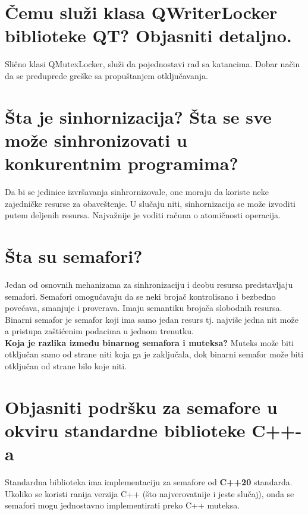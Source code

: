 \documentclass[a4paper]{article}
\begin{document}
\section{Čemu služi klasa QWriterLocker biblioteke QT? Objasniti detaljno.}

  Slično klasi QMutexLocker, služi da pojednostavi rad sa katancima. 
  Dobar način da se preduprede greške sa propuštanjem otključavanja.
  
\section{Šta je sinhornizacija?	Šta se sve može sinhronizovati u konkurentnim programima?}
  Da bi se jedinice izvršavanja sinhrornizovale, one moraju da koriste neke zajedničke 
  resurse za obaveštenje. U slučaju niti, sinhornizacija se može izvoditi putem deljenih resursa. 
  Najvažnije je voditi računa o atomičnosti operacija.
  
\section{Šta su semafori?}
  Jedan od osnovnih mehanizama za sinhronizaciju i deobu resursa predstavljaju semafori. 
  Semafori omogućavaju da se neki brojač kontrolisano i bezbedno povećava, smanjuje i proverava. 
  Imaju semantiku brojača slobodnih resursa.\\

  Binarni semafor je semafor koji ima samo jedan resurs tj. najviše jedna nit može a pristupa 
  zaštićenim podacima u jednom trenutku.\\
  \indent \textbf{Koja je razlika između binarnog semafora i muteksa?} Muteks može biti 
  otključan samo od strane niti koja ga je zaključala, dok binarni semafor može biti otključan od 
  strane bilo koje niti.
  
\section{Objasniti podršku za semafore u okviru standardne biblioteke C++-a}
  Standardna biblioteka ima implementaciju za semafore od \textbf{C++20} standarda.
  Ukoliko se koristi ranija verzija C++ (što najverovatnije i jeste slučaj), onda
  se semafori mogu jednostavno implementirati preko C++ muteksa. 
  \cite{cppref_semaphore}
\end{document}
